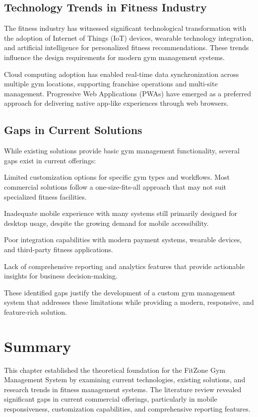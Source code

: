 \documentclass[12pt,a4paper]{report}
\begin{document}
\subsection{Technology Trends in Fitness Industry}

The fitness industry has witnessed significant technological transformation with the adoption of Internet of Things (IoT) devices, wearable technology integration, and artificial intelligence for personalized fitness recommendations. These trends influence the design requirements for modern gym management systems.

Cloud computing adoption has enabled real-time data synchronization across multiple gym locations, supporting franchise operations and multi-site management. Progressive Web Applications (PWAs) have emerged as a preferred approach for delivering native app-like experiences through web browsers.

\subsection{Gaps in Current Solutions}

While existing solutions provide basic gym management functionality, several gaps exist in current offerings:

Limited customization options for specific gym types and workflows. Most commercial solutions follow a one-size-fits-all approach that may not suit specialized fitness facilities.

Inadequate mobile experience with many systems still primarily designed for desktop usage, despite the growing demand for mobile accessibility.

Poor integration capabilities with modern payment systems, wearable devices, and third-party fitness applications.

Lack of comprehensive reporting and analytics features that provide actionable insights for business decision-making.

These identified gaps justify the development of a custom gym management system that addresses these limitations while providing a modern, responsive, and feature-rich solution.

\section{Summary}
\label{sec:background-summary}

This chapter established the theoretical foundation for the FitZone Gym Management System by examining current technologies, existing solutions, and research trends in fitness management systems. The literature review revealed significant gaps in current commercial offerings, particularly in mobile responsiveness, customization capabilities, and comprehensive reporting features.
\end{document}
